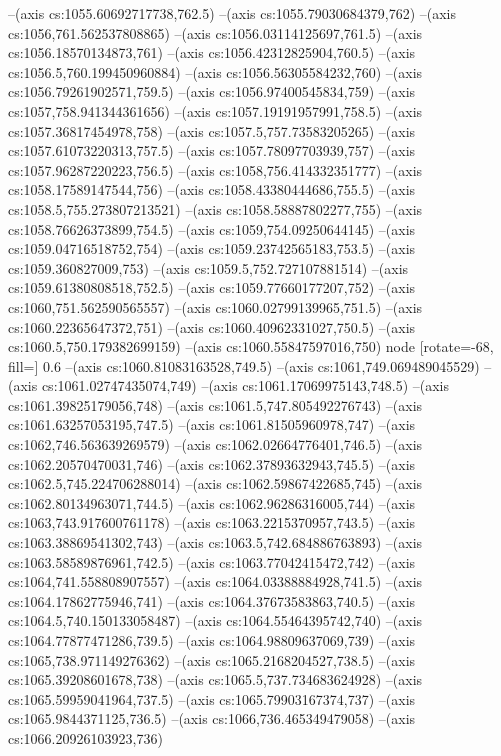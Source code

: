 --(axis cs:1055.60692717738,762.5)
--(axis cs:1055.79030684379,762)
--(axis cs:1056,761.562537808865)
--(axis cs:1056.03114125697,761.5)
--(axis cs:1056.18570134873,761)
--(axis cs:1056.42312825904,760.5)
--(axis cs:1056.5,760.199450960884)
--(axis cs:1056.56305584232,760)
--(axis cs:1056.79261902571,759.5)
--(axis cs:1056.97400545834,759)
--(axis cs:1057,758.941344361656)
--(axis cs:1057.19191957991,758.5)
--(axis cs:1057.36817454978,758)
--(axis cs:1057.5,757.73583205265)
--(axis cs:1057.61073220313,757.5)
--(axis cs:1057.78097703939,757)
--(axis cs:1057.96287220223,756.5)
--(axis cs:1058,756.414332351777)
--(axis cs:1058.17589147544,756)
--(axis cs:1058.43380444686,755.5)
--(axis cs:1058.5,755.273807213521)
--(axis cs:1058.58887802277,755)
--(axis cs:1058.76626373899,754.5)
--(axis cs:1059,754.09250644145)
--(axis cs:1059.04716518752,754)
--(axis cs:1059.23742565183,753.5)
--(axis cs:1059.360827009,753)
--(axis cs:1059.5,752.727107881514)
--(axis cs:1059.61380808518,752.5)
--(axis cs:1059.77660177207,752)
--(axis cs:1060,751.562590565557)
--(axis cs:1060.02799139965,751.5)
--(axis cs:1060.22365647372,751)
--(axis cs:1060.40962331027,750.5)
--(axis cs:1060.5,750.179382699159)
--(axis cs:1060.55847597016,750) node [rotate=-68, fill=\bgcol] {0.6}
--(axis cs:1060.81083163528,749.5)
--(axis cs:1061,749.069489045529)
--(axis cs:1061.02747435074,749)
--(axis cs:1061.17069975143,748.5)
--(axis cs:1061.39825179056,748)
--(axis cs:1061.5,747.805492276743)
--(axis cs:1061.63257053195,747.5)
--(axis cs:1061.81505960978,747)
--(axis cs:1062,746.563639269579)
--(axis cs:1062.02664776401,746.5)
--(axis cs:1062.20570470031,746)
--(axis cs:1062.37893632943,745.5)
--(axis cs:1062.5,745.224706288014)
--(axis cs:1062.59867422685,745)
--(axis cs:1062.80134963071,744.5)
--(axis cs:1062.96286316005,744)
--(axis cs:1063,743.917600761178)
--(axis cs:1063.2215370957,743.5)
--(axis cs:1063.38869541302,743)
--(axis cs:1063.5,742.684886763893)
--(axis cs:1063.58589876961,742.5)
--(axis cs:1063.77042415472,742)
--(axis cs:1064,741.558808907557)
--(axis cs:1064.03388884928,741.5)
--(axis cs:1064.17862775946,741)
--(axis cs:1064.37673583863,740.5)
--(axis cs:1064.5,740.150133058487)
--(axis cs:1064.55464395742,740)
--(axis cs:1064.77877471286,739.5)
--(axis cs:1064.98809637069,739)
--(axis cs:1065,738.971149276362)
--(axis cs:1065.2168204527,738.5)
--(axis cs:1065.39208601678,738)
--(axis cs:1065.5,737.734683624928)
--(axis cs:1065.59959041964,737.5)
--(axis cs:1065.79903167374,737)
--(axis cs:1065.9844371125,736.5)
--(axis cs:1066,736.465349479058)
--(axis cs:1066.20926103923,736)
